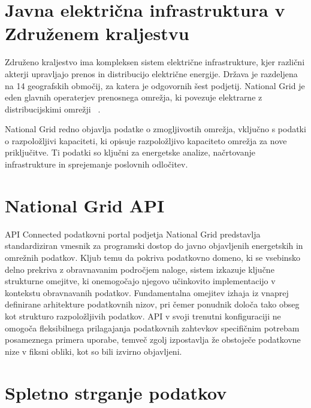 \documentclass[a4paper,12pt,openright]{book}
\begin{document}
\section{Javna električna infrastruktura v Združenem kraljestvu}

Združeno kraljestvo ima kompleksen sistem električne infrastrukture, kjer različni akterji upravljajo prenos in distribucijo električne energije. Država je razdeljena na 14 geografskih območij, za katera je odgovornih šest podjetij. National Grid je eden glavnih operaterjev prenosnega omrežja, ki povezuje elektrarne z distribucijskimi omrežji ~\cite{ng_infrastructure}.

National Grid redno objavlja podatke o zmogljivostih omrežja, vključno s podatki o razpoložljivi kapaciteti, ki opisuje razpoložljivo kapaciteto omrežja za nove priključitve. Ti podatki so ključni za energetske analize, načrtovanje infrastrukture in sprejemanje poslovnih odločitev. ~\cite{KUFEOGLU2019412}

\section{National Grid API}
API Connected podatkovni portal podjetja National Grid predstavlja standardiziran vmesnik za programski dostop do javno objavljenih energetskih in omrežnih podatkov. Kljub temu da pokriva podatkovno domeno, ki se vsebinsko delno prekriva z obravnavanim področjem naloge, sistem izkazuje ključne strukturne omejitve, ki onemogočajo njegovo učinkovito implementacijo v kontekstu obravnavanih podatkov.
Fundamentalna omejitev izhaja iz vnaprej definirane arhitekture podatkovnih nizov, pri čemer ponudnik določa tako obseg kot strukturo razpoložljivih podatkov. API v svoji trenutni konfiguraciji ne omogoča fleksibilnega prilagajanja podatkovnih zahtevkov specifičnim potrebam posameznega primera uporabe, temveč zgolj izpostavlja že obstoječe podatkovne nize v fiksni obliki, kot so bili izvirno objavljeni.

\section{Spletno strganje podatkov}
\end{document}
